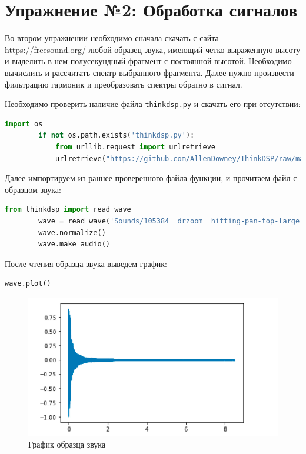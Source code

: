 \documentclass[a4]{article}
\begin{document}
    \newpage


    \section{Упражнение №2: Обработка сигналов}
    \label{sec:2_signal_processing}

    Во втором упражнении необходимо сначала скачать с сайта \href{https://freesound.org/}{https://freesound.org/} любой образец звука, имеющий четко выраженную высоту и выделить в нем полусекундный фрагмент с постоянной высотой.
    Необходимо вычислить и рассчитать спектр выбранного фрагмента.
    Далее нужно произвести фильтрацию гармоник и преобразовать спектры обратно в сигнал.

    Необходимо проверить наличие файла \texttt{thinkdsp.py} и скачать его при отсутствии:

    \begin{lstlisting}[language=Python, caption= Проверка наличия \texttt{thinkdsp.py}, label={lst:check_thinkdsp}]
        import os
        if not os.path.exists('thinkdsp.py'):
            from urllib.request import urlretrieve
            urlretrieve("https://github.com/AllenDowney/ThinkDSP/raw/master/code/thinkdsp.py", "thinkdsp.py")
    \end{lstlisting}

    Далее импортируем из раннее проверенного файла функции, и прочитаем файл с образцом звука:

    \begin{lstlisting}[language=Python, caption= Чтение скаченного образца звука, label={lst:read_wav}]
        from thinkdsp import read_wave
        wave = read_wave('Sounds/105384__drzoom__hitting-pan-top-large.wav')
        wave.normalize()
        wave.make_audio()
    \end{lstlisting}

    После чтения образца звука выведем график:

    \begin{lstlisting}[language=Python, caption= Вывод графика образца,label={lst:wav_plot}]
        wave.plot()
    \end{lstlisting}

    \begin{figure}[H]
        \centering
        \includegraphics[width=\textwidth]{wav_plot_1}
        \caption{График образца звука}
        \label{fig:plot_wav_1}
    \end{figure}
\end{document}
